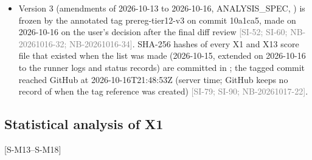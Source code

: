 \documentclass[11pt]{article}
\newcommand{\src}[1]{{\scriptsize\textcolor{gray}{[#1]}}}
\begin{document}
\begin{itemize}
\item Version 3 (amendments of 2026-10-13 to 2026-10-16, ANALYSIS\_SPEC, ) is frozen by the annotated tag prereg-tier12-v3 on commit 10a1ca5, made on 2026-10-16 on the user's decision after the final diff review \src{SI-52; SI-60; NB-20261016-32; NB-20261016-34}. SHA-256 hashes of every X1 and X13 score file that existed when the list was made (2026-10-15, extended on 2026-10-16 to the runner logs and status records) are committed in ; the tagged commit reached GitHub at 2026-10-16T21:48:53Z (server time; GitHub keeps no record of when the tag reference was created) \src{SI-79; SI-90; NB-20261017-22}.
\end{itemize}

\subsection{Statistical analysis of X1}
[S-M13--S-M18]
\end{document}
